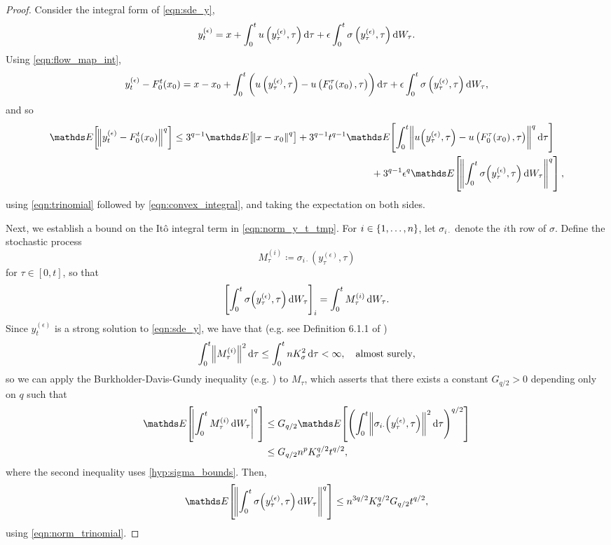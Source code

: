 \begin{proof}
	Consider the integral form of \eqref{eqn:sde_y},
	\[
		y_t^{(\epsilon)} = x + \int_0^t{u\left(y_\tau^{(\epsilon)}, \tau\right)\dif\tau} + \epsilon\int_0^t{\sigma\left(y_\tau^{(\epsilon)}, \tau\right)\dif W_\tau}.
	\]
	Using \eqref{eqn:flow_map_int},
	\[
		y_t^{(\epsilon)} - F_0^t\!\left(x_0\right) = x - x_0 + \int_0^{t}{\left(u\left(y_\tau^{(\epsilon)}, \tau\right) - u\left(F_0^{\tau}\!\left(x_0\right), \tau\right)\right)\dif\tau} + \epsilon\int_0^t{\sigma\left(y_\tau^{(\epsilon)}, \tau\right)\dif W_\tau},
	\]
	and so
	\begin{equation}
		\avg{\norm{y_t^{(\epsilon)} - F_0^t\!\left(x_0\right)}^q} \leq \begin{multlined}[t]
			3^{q-1}\avg{\norm{x - x_0}^q} + 3^{q-1}t^{q-1}\avg{\int_0^{t}{\norm{u\!\left(y_\tau^{(\epsilon)}, \tau\right) - u\left(F_0^{\tau}\!\left(x_0\right), \tau\right)}^q\dif\tau}} \\
			+ 3^{q-1}\epsilon^q\avg{\norm{\int_0^t{\sigma\!\left(y_\tau^{(\epsilon)}, \tau\right)\dif W_\tau}}^q},
		\end{multlined}
		\label{eqn:norm_y_t_tmp}
	\end{equation}
	using \eqref{eqn:trinomial} followed by \eqref{eqn:convex_integral}, and taking the expectation on both sides.

	Next, we establish a bound on the It\^o integral term in \eqref{eqn:norm_y_t_tmp}.
	For \(i \in \set{1,\hdots,n}\), let \(\sigma_{i\cdot}\) denote the \(i\)th row of \(\sigma\).
	Define the stochastic process
	\[
		M_\tau^{(i)} \coloneqq \sigma_{i\cdot}\!\left(y_\tau^{(\epsilon)}, \tau\right)
	\]
	for \(\tau \in [0,t]\), so that
	\[
		\left[\int_0^t{\sigma\!\left(y_\tau^{(\epsilon)}, \tau\right)\dif W_\tau}\right]_i = \int_0^t{M_\tau^{(i)}\dif W_\tau}.
	\]
	Since \(y_t^{(\epsilon)}\) is a strong solution to \eqref{eqn:sde_y}, we have that (e.g. see Definition 6.1.1 of \cite{KallianpurSundar_2014_StochasticAnalysisDiffusion})
	\[
		\int_0^t{\norm{M_\tau^{(i)}}^2\dif\tau} \leq \int_0^t{nK_\sigma^2\dif\tau} < \infty, \quad \text{almost surely},
	\]
	so we can apply the Burkholder-Davis-Gundy inequality (e.g. \cite[Thm. 5.6.3]{KallianpurSundar_2014_StochasticAnalysisDiffusion}) to \(M_\tau\), which asserts that there exists a constant \(G_{q/2} > 0\) depending only on \(q\) such that
	\begin{align*}
		\avg{\abs{\int_0^t{M_\tau^{(i)}\dif W_\tau}}^{q}} & \leq G_{q/2} \avg{\left(\int_{0}^t{\norm{\sigma_{i\cdot}\!\left(y_\tau^{(\epsilon)}, \tau\right)}^2\dif\tau}\right)^{q/2}} \\
		                                                  & \leq G_{q/2} n^p K_{\sigma}^{q/2} t^{q/2},
	\end{align*}
	where the second inequality uses \ref{hyp:sigma_bounds}.
	Then,
	\begin{equation}
		\avg{\norm{\int_0^t{\sigma\!\left(y_\tau^{(\epsilon)}, \tau\right)\dif W_\tau}}^{q}} \leq n^{3q/2} K_\sigma^{q/2} G_{q/2} t^{q/2},
		\label{eqn:z_sigma_bound}
	\end{equation}
	using \eqref{eqn:norm_trinomial}.


\end{proof}
